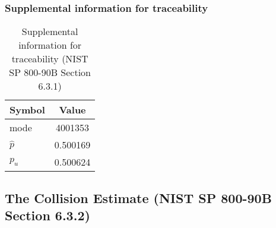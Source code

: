 \documentclass[a3paper,xelatex,english]{bxjsarticle}
\begin{document}
\subsubsection{Supplemental information for traceability}
\renewcommand{\arraystretch}{1.8}
\begin{table}[h]
\caption{Supplemental information for traceability (NIST SP 800-90B Section 6.3.1)}
\begin{center}
\begin{tabular}{|l|c|}
\hline 
\rowcolor{anotherlightblue} %
Symbol				& Value \\ \hline 
mode				&  4001353\\ \hline 
$\hat{p}$ 			& 0.500169\\ \hline
$p_u$				& 0.500624\\ \hline
\end{tabular}
\end{center}
\end{table}
\renewcommand{\arraystretch}{1.4}
\clearpage
\subsection{The Collision Estimate (NIST SP 800-90B Section 6.3.2)}\label{sec:Binary632}
\end{document}
